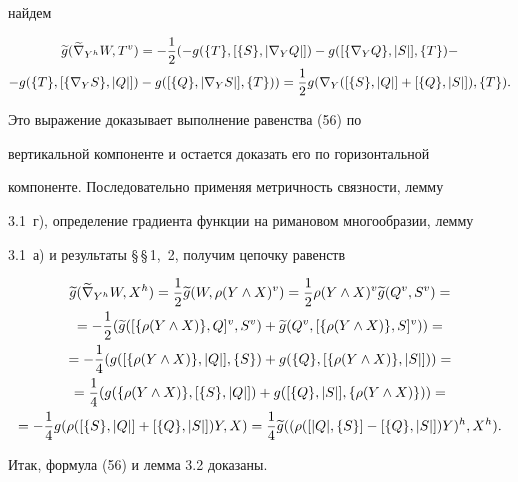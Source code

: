 найдем


\begin{multline*}


\g{g}(\grn{\gh{Y}}W,\gv{T})=-\1(-g(\{T\},[\{S\},|\n{Y}{Q}|])-


g([\{\n{Y}{Q}\},|S|],\{T\})-\\


-g(\{T\},[\{\n{Y}{S}\},|Q|])-g([\{Q\},|\n{Y}{S}|],\{T\}))=


\1 g(\n{Y}{([\{S\},|Q|]+[\{Q\},|S|])},\{T\}).


\end{multline*}


Это выражение доказывает выполнение равенства (56) по


вертикальной компоненте и остается доказать его по горизонтальной


компоненте. Последовательно применяя метричность связности, лемму


3.1~г), определение градиента функции на римановом многообразии, лемму


3.1~а) и результаты \S\,\S\,1,~2, получим цепочку равенств


\begin{gather*}


\g{g}(\grn{\gh{Y}}{W},\gh{X})=\1\g{g}(W,\gv{\rho(Y\land X)})=


\1\gv{\rho(Y\land X)}\g{g}(\gv{Q},\gv{S})=\\


=-\1(\g{g}(\gv{[\{\rho(Y\land X)\},Q]},\gv{S})+\g{g}(\gv{Q},


\gv{[\{\rho(Y\land X)\},S]})) =\\


=-\4(g([\{\rho(Y\land X)\},|Q|],\{S\})+


g(\{Q\},[\{\rho(Y\land X)\},|S|]))=\\


=\4(g(\{\rho(Y\land X)\},[\{ S\},|Q|])


+g([\{Q\},|S|],\{\rho(Y\land X)\}))=\\


=-\4 g(\rho([\{S\},|Q|]+[\{Q\},|S|])Y,X)


=\4 \g{g}(\gh{(\rho([|Q|,\{S\}]-[\{Q\},|S|])Y)},\gh{X}).


\end{gather*}


Итак, формула (56) и лемма 3.2 доказаны.


\medskip





